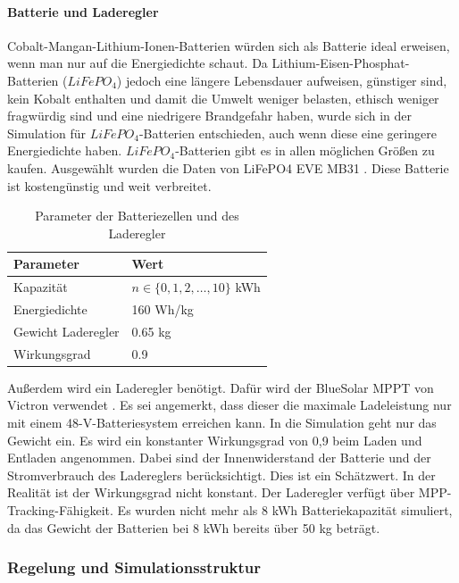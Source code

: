\paragraph{Batterie und Laderegler}
Cobalt-Mangan-Lithium-Ionen-Batterien würden sich als Batterie ideal erweisen, wenn man nur auf die Energiedichte schaut. Da Lithium-Eisen-Phosphat-Batterien ($LiFePO_4$) jedoch eine längere Lebensdauer aufweisen, günstiger sind, kein Kobalt enthalten und damit die Umwelt weniger belasten, ethisch weniger fragwürdig sind und eine niedrigere Brandgefahr haben, wurde sich in der Simulation für $LiFePO_4$-Batterien entschieden, auch wenn diese eine geringere Energiedichte haben. $LiFePO_4$-Batterien gibt es in allen möglichen Größen zu kaufen. Ausgewählt wurden die Daten von LiFePO4 EVE MB31 \cite{battery}. Diese Batterie ist kostengünstig und weit verbreitet.
\begin{table}[h]
\centering
\begin{tabular}{|l|l|}
\hline
\textbf{Parameter} & \textbf{Wert} \\ \hline
Kapazität & $ n \in \{0,1,2,\dots,10\}$ kWh \\ \hline
Energiedichte & 160 Wh/kg \\ \hline
Gewicht Laderegler & 0.65 kg \\ \hline
Wirkungsgrad & 0.9 \\ \hline
\end{tabular}
\caption{Parameter der Batteriezellen und des Laderegler \cite{battery,laderegler}}
\end{table}

Außerdem wird ein Laderegler benötigt. Dafür wird der BlueSolar MPPT von Victron verwendet \cite{laderegler}. Es sei angemerkt, dass dieser die maximale Ladeleistung nur mit einem 48-V-Batteriesystem erreichen kann. In die Simulation geht nur das Gewicht ein. Es wird ein konstanter Wirkungsgrad von 0,9 beim Laden und Entladen angenommen. Dabei sind der Innenwiderstand der Batterie und der Stromverbrauch des Ladereglers berücksichtigt. Dies ist ein Schätzwert. In der Realität ist der Wirkungsgrad nicht konstant. Der Laderegler verfügt über MPP-Tracking-Fähigkeit. Es wurden nicht mehr als 8 kWh Batteriekapazität simuliert, da das Gewicht der Batterien bei 8 kWh bereits über 50 kg beträgt.


\subsubsection{Regelung und Simulationsstruktur}

